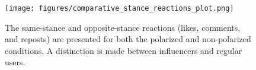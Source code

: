 \begin{figure}[htbp]
    \centering
    \texttt{[image: figures/comparative\_stance\_reactions\_plot.png]}
    \caption{The same-stance and opposite-stance reactions (likes, comments, and reposts) are presented for both the polarized and non-polarized conditions. A distinction is made between influencers and regular users.}
    \label{fig:stance-reactions}
\end{figure}
